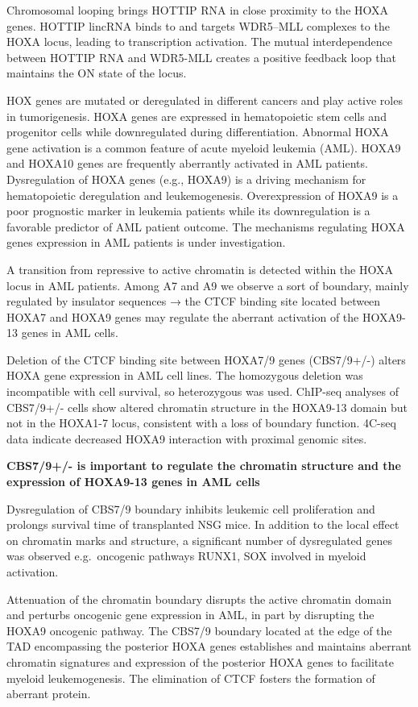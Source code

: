 Chromosomal looping brings HOTTIP RNA in close proximity to the HOXA genes. HOTTIP lincRNA binds to and targets WDR5--MLL complexes to the HOXA locus, leading to transcription activation. The mutual interdependence between HOTTIP RNA and WDR5-MLL creates a positive feedback loop that maintains the ON state of the locus.

HOX genes are mutated or deregulated in different cancers and play active roles in tumorigenesis. HOXA genes are expressed in hematopoietic stem cells and progenitor cells while downregulated during differentiation. Abnormal HOXA gene activation is a common feature of acute myeloid leukemia (AML). HOXA9 and HOXA10 genes are frequently aberrantly activated in AML patients. Dysregulation of HOXA genes (e.g., HOXA9) is a driving mechanism for hematopoietic deregulation and leukemogenesis. Overexpression of HOXA9 is a poor prognostic marker in leukemia patients while its downregulation is a favorable predictor of AML patient outcome. The mechanisms regulating HOXA genes expression in AML patients is under investigation.

A transition from repressive to active chromatin is detected within the HOXA locus in AML patients. Among A7 and A9 we observe a sort of boundary, mainly regulated by insulator sequences → the CTCF binding site located between HOXA7 and HOXA9 genes may regulate the aberrant activation of the HOXA9-13 genes in AML cells.

Deletion of the CTCF binding site between HOXA7/9 genes (CBS7/9+/-) alters HOXA gene expression in AML cell lines. The homozygous deletion was incompatible with cell survival, so heterozygous was used. ChIP-seq analyses of CBS7/9+/- cells show altered chromatin structure in the HOXA9-13 domain but not in the HOXA1-7 locus, consistent with a loss of boundary function. 4C-seq data indicate decreased HOXA9 interaction with proximal genomic sites.

\textbf{CBS7/9+/- is important to regulate the chromatin structure and the expression of HOXA9-13 genes in AML cells}

Dysregulation of CBS7/9 boundary inhibits leukemic cell proliferation and prolongs survival time of transplanted NSG mice. In addition to the local effect on chromatin marks and structure, a significant number of dysregulated genes was observed e.g.~oncogenic pathways RUNX1, SOX involved in myeloid activation.

Attenuation of the chromatin boundary disrupts the active chromatin domain and perturbs oncogenic gene expression in AML, in part by disrupting the HOXA9 oncogenic pathway. The CBS7/9 boundary located at the edge of the TAD encompassing the posterior HOXA genes establishes and maintains aberrant chromatin signatures and expression of the posterior HOXA genes to facilitate myeloid leukemogenesis. The elimination of CTCF fosters the formation of aberrant protein.

